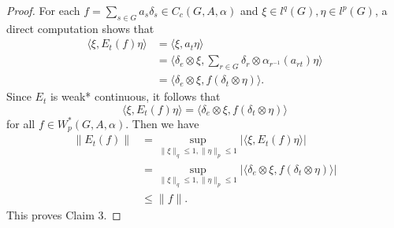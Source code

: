\documentclass[reqno,11pt]{amsart}
\theoremstyle{plain}
\theoremstyle{definition}
\theoremstyle{remark}
\newcommand{\la}{\langle}
\newcommand{\ra}{\rangle}
\begin{document}
\begin{proof}
For each $f=\sum_{s\in G}a_s\delta_s \in C_c(G,A,\alpha)$ and $\xi\in l^q(G),\eta\in l^p(G)$, a direct computation shows that
$$\begin{aligned} \la \xi,E_t(f)\eta\ra
 &=\la \xi,a_t\eta\ra \\
 &=\la \delta_e\otimes\xi,\sum_{r\in G}\delta_r\otimes\alpha_{r^{-1}}(a_{rt})\eta\ra\\
 &=\la \delta_e\otimes\xi, f(\delta_t\otimes \eta)\ra. \end{aligned}$$
Since $E_t$ is weak* continuous, it follows that $$ \la \xi,E_t(f)\eta\ra=\la \delta_e\otimes\xi, f(\delta_t\otimes \eta)\ra$$ for all $f\in W^*_p(G,A,\alpha)$. Then we have $$\begin{aligned} \|E_t(f)\|
 &=\sup_{\|\xi\|_q\leq 1,\|\eta\|_p\leq 1}|\la \xi,E_t(f)\eta\ra| \\
 &=\sup_{\|\xi\|_q\leq 1,\|\eta\|_p\leq 1}|\la \delta_e\otimes \xi,f(\delta_t\otimes\eta)\ra|\\
 &\leq \|f\|. \end{aligned}$$
This proves Claim 3.\end{proof}
\end{document}
